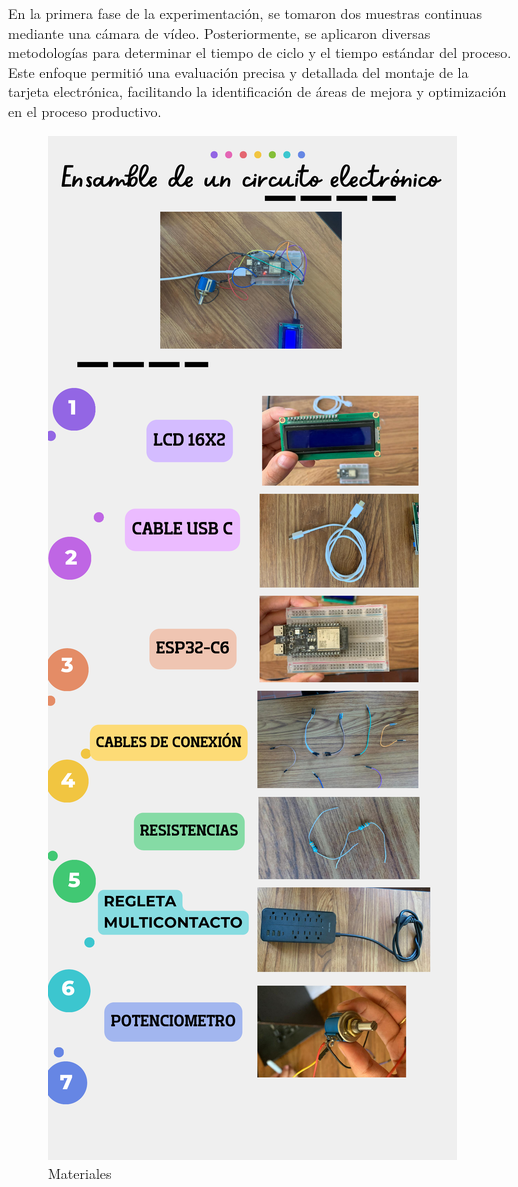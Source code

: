     En la primera fase de la experimentación, se tomaron dos muestras continuas mediante una cámara de vídeo. Posteriormente, se aplicaron diversas metodologías para determinar el tiempo de ciclo y el tiempo estándar del proceso. Este enfoque permitió una evaluación precisa y detallada del montaje de la tarjeta electrónica, facilitando la identificación de áreas de mejora y optimización en el proceso productivo.
    \begin{figure}[H]
        \centering
        \includegraphics[trim = {25mm 50mm 20mm 140mm},clip,scale=0.3]{16/Img/materialesCE.pdf}
        \caption{Materiales}
        \label{fig:Materiales}
    \end{figure}
    
